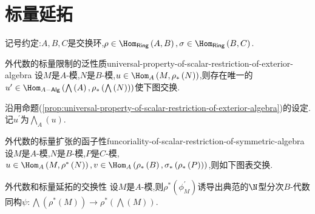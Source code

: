 \section{标量延拓}

记号约定:$A,B,C$是交换环,$\rho\in\Hom_{\mathsf{Ring}}\left(A,B\right),\sigma\in\Hom_{\mathsf{Ring}}\left(B,C\right)$.

\begin{proposition}{外代数的标量限制的泛性质}{universal-property-of-scalar-restriction-of-exterior-algebra}
	设$M$是$A$-模,$N$是$B$-模,$u\in\Hom_{A}\left(M,\rho_{\ast}\left(N\right)\right)$,则存在唯一的$u^{\prime}\in\Hom_{A-\mathsf{Alg}}\left(\bigwedge\left(A\right),\rho_{\ast}\left(\bigwedge\left(N\right)\right)\right)$使下图交换.
	\begin{center}
	\end{center}
\end{proposition}

\begin{definition}{}{}
	沿用命题(\ref{prop:universal-property-of-scalar-restriction-of-exterior-algebra})的设定.记$u^{\prime}$为$\bigwedge_{A}\left(u\right)$.
\end{definition}

\begin{proposition}{外代数的标量扩张的函子性}{funcoriality-of-scalar-restriction-of-symmetric-algebra}
	设$M$是$A$-模,$N$是$B$-模,$P$是$C$-模,$u\in\Hom_{A}\left(M,\rho^{\ast}\left(N\right)\right),v\in\Hom_{A}\left(\rho_{\ast}\left(B\right),\sigma_{\ast}\left(\rho_{\ast}\left(P\right)\right)\right)$,则如下图表交换.
	\begin{center}
	\end{center}
\end{proposition}

\begin{proposition}{外代数和标量延拓的交换性}{}
	设$M$是$A$-模,则$\rho^{\ast}\left(\phi_{M}^{\prime}\right)$诱导出典范的$\N$型分次$B$-代数同构$\psi:\bigwedge\left(\rho^{\ast}\left(M\right)\right)\to\rho^{\ast}\left(\bigwedge\left(M\right)\right)$.
\end{proposition}